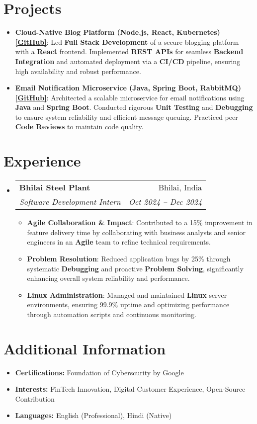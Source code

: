 \documentclass[letterpaper,10pt]{article}
\makeatletter
\newcommand{\resumeItem}[2]{\item \small{\textbf{#1}: #2}}
\newcommand{\resumeSubheading}[4]{
  \item
    \begin{tabular*}{0.97\textwidth}{l@{\extracolsep{\fill}}r}
      \textbf{#1} & #2 \\
      \textit{\small #3} & \textit{\small #4} \\
    \end{tabular*}\vspace{-3pt}
}
\newcommand{\resumeSubHeadingListStart}{\begin{itemize}[leftmargin=*]}
\newcommand{\resumeSubHeadingListEnd}{\end{itemize}}
\newcommand{\resumeItemListStart}{\begin{itemize}[leftmargin=*]}
\newcommand{\resumeItemListEnd}{\end{itemize}\vspace{-4pt}}
\makeatother
\begin{document}
\section{Projects}
\resumeSubHeadingListStart
  \resumeItem{Cloud-Native Blog Platform (Node.js, React, Kubernetes) \href{https://github.com/Anurag-xo/Blog-web}{[GitHub]}}
    {Led \textbf{Full Stack Development} of a secure blogging platform with a \textbf{React} frontend. Implemented \textbf{REST APIs} for seamless \textbf{Backend Integration} and automated deployment via a \textbf{CI/CD} pipeline, ensuring high availability and robust performance.}
  \resumeItem{Email Notification Microservice (Java, Spring Boot, RabbitMQ) \href{https://github.com/Anurag-xo/EmailNotification-microservice}{[GitHub]}}
    {Architected a scalable microservice for email notifications using \textbf{Java} and \textbf{Spring Boot}. Conducted rigorous \textbf{Unit Testing} and \textbf{Debugging} to ensure system reliability and efficient message queuing. Practiced peer \textbf{Code Reviews} to maintain code quality.}
\resumeSubHeadingListEnd

\section{Experience}
\resumeSubHeadingListStart
  \resumeSubheading
    {Bhilai Steel Plant}{Bhilai, India}
    {Software Development Intern}{Oct 2024 – Dec 2024}
  \resumeItemListStart
    \resumeItem{Agile Collaboration & Impact}{Contributed to a 15\% improvement in feature delivery time by collaborating with business analysts and senior engineers in an \textbf{Agile} team to refine technical requirements.}
    \resumeItem{Problem Resolution}{Reduced application bugs by 25\% through systematic \textbf{Debugging} and proactive \textbf{Problem Solving}, significantly enhancing overall system reliability and performance.}
    \resumeItem{Linux Administration}{Managed and maintained \textbf{Linux} server environments, ensuring 99.9\% uptime and optimizing performance through automation scripts and continuous monitoring.}
  \resumeItemListEnd
\resumeSubHeadingListEnd
\section{Additional Information}
\resumeSubHeadingListStart
  \item[] \textbf{Certifications:} Foundation of Cyberscurity by Google 
  \item[] \textbf{Interests:} FinTech Innovation, Digital Customer Experience, Open-Source Contribution
  \item[] \textbf{Languages:} English (Professional), Hindi (Native)
\resumeSubHeadingListEnd
\end{document}
